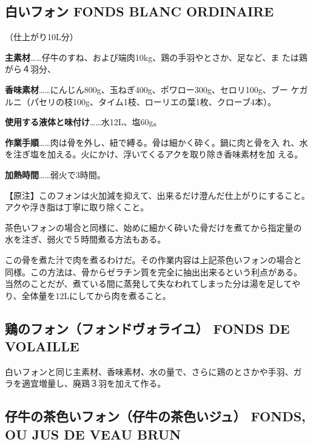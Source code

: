 \documentclass[twoside,12Q,b5paper,tombo]{escoffierltjsbook}
\newenvironment{recette}{\begin{multicols}{2}}{\end{multicols}}
\begin{document}
\begin{recette}
\subsection{白いフォン FONDS BLANC
ORDINAIRE}\label{ux767dux3044ux30d5ux30a9ux30f3-fonds-blanc-ordinaire}

（仕上がり10L分）

\textbf{主素材}\ldots{}\ldots{}仔牛のすね、および端肉10kg、鶏の手羽やとさか、足など、ま
たは鶏がら４羽分、

\textbf{香味素材}\ldots{}\ldots{}にんじん800g、玉ねぎ400g、ポワロー300g、セロリ100g、ブー
ケガルニ（パセリの枝100g、タイム1枝、ローリエの葉1枚、クローブ4本）。

\textbf{使用する液体と味付け}\ldots{}\ldots{}水12L、塩60g。

\textbf{作業手順}\ldots{}\ldots{}肉は骨を外し、紐で縛る。骨は細かく砕く。鍋に肉と骨を入
れ、水を注ぎ塩を加える。火にかけ、浮いてくるアクを取り除き香味素材を加
える。

\textbf{加熱時間}\ldots{}\ldots{}弱火で3時間。

【原注】このフォンは火加減を抑えて、出来るだけ澄んだ仕上がりにすること。
アクや浮き脂は丁寧に取り除くこと。

茶色いフォンの場合と同様に、始めに細かく砕いた骨だけを煮てから指定量の
水を注ぎ、弱火で５時間煮る方法もある。

この骨を煮た汁で肉を煮るわけだ。その作業内容は上記茶色いフォンの場合と
同様。この方法は、骨からゼラチン質を完全に抽出出来るという利点がある。
当然のことだが、煮ている間に蒸発して失なわれてしまった分は湯を足してや
り、全体量を12Lにしてから肉を煮ること。

\subsection{鶏のフォン（フォンドヴォライユ） FONDS DE
VOLAILLE}\label{ux9d8fux306eux30d5ux30a9ux30f3ux30d5ux30a9ux30f3ux30c9ux30f4ux30a9ux30e9ux30a4ux30e6-fonds-de-volaille}

白いフォンと同じ主素材、香味素材、水の量で、さらに鶏のとさかや手羽、ガ
ラを適宜増量し、廃鶏３羽を加えて作る。

\subsection{仔牛の茶色いフォン（仔牛の茶色いジュ） FONDS, OU JUS DE VEAU
BRUN}\label{ux4ed4ux725bux306eux8336ux8272ux3044ux30d5ux30a9ux30f3ux4ed4ux725bux306eux8336ux8272ux3044ux30b8ux30e5-fonds-ou-jus-de-veau-brun}


\end{recette}
\end{document}

